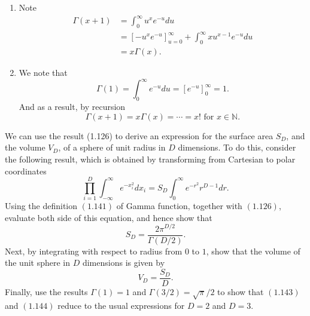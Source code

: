 \begin{enumerate}[leftmargin={*}]
\item Note 
\begin{align*}
\Gamma(x+1) & =\int_{0}^{\infty}u^{x}e^{-u}du\\
 & =\left[-u^{x}e^{-u}\right]_{u=0}^{\infty}+\int_{0}^{\infty}xu^{x-1}e^{-u}du\\
 & =x\Gamma(x).
\end{align*}
\item We note that 
\[
\Gamma(1)=\int_{0}^{\infty}e^{-u}du=\left[e^{-u}\right]_{0}^{\infty}=1.
\]
And as a result, by recursion
\[
\Gamma(x+1)=x\Gamma(x)=\cdots=x!\text{ for }x\in\mathbb{N}.
\]
\end{enumerate}
\begin{cBoxA}{}
 We can use the result (1.126) to derive an expression for the surface
area $S_{D}$, and the volume $V_{D}$, of a sphere of unit radius
in $D$ dimensions. To do this, consider the following result, which
is obtained by transforming from Cartesian to polar coordinates
\[
\prod_{i=1}^{D}\int_{-\infty}^{\infty}e^{-x_{i}^{2}}dx_{i}=S_{D}\int_{0}^{\infty}e^{-r^{2}}r^{D-1}dr.
\]
Using the definition $(1.141)$ of Gamma function, together with $(1.126)$,
evaluate both side of this equation, and hence show that 
\[
S_{D}=\frac{2\pi^{D/2}}{\Gamma(D/2)}.
\]
Next, by integrating with respect to radius from $0$ to $1$, show
that the volume of the unit sphere in $D$ dimensions is given by
\[
V_{D}=\frac{S_{D}}{D}.
\]
Finally, use the results $\Gamma(1)=1$ and $\Gamma(3/2)=\sqrt{\pi}/2$
to show that $(1.143)$ and $(1.144)$ reduce to the usual expressions
for $D=2$ and $D=3$. 
\end{cBoxA}

